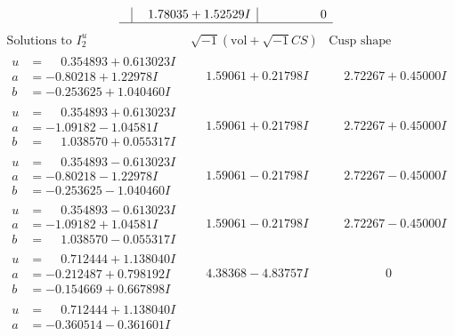 \documentclass[1p]{elsarticle_modified}
\theoremstyle{definition}
\newcommand{\I}{\sqrt{-1}}
\begin{document}
$$\begin{array}{c|c|c}
 & \phantom{-}1.78035 + 1.52529 I & \phantom{-0.000000 } 0\\
 \hline 
 \end{array}$$\newpage$$\begin{array}{c|c|c}  
\text{Solutions to }I^u_{2}& \I (\text{vol} + \sqrt{-1}CS) & \text{Cusp shape}\\
 \hline 
\begin{aligned}
u &= \phantom{-}0.354893 + 0.613023 I \\
a &= -0.80218 + 1.22978 I \\
b &= -0.253625 + 1.040460 I\end{aligned}
 & \phantom{-}1.59061 + 0.21798 I & \phantom{-}2.72267 + 0.45000 I \\ \hline\begin{aligned}
u &= \phantom{-}0.354893 + 0.613023 I \\
a &= -1.09182 - 1.04581 I \\
b &= \phantom{-}1.038570 + 0.055317 I\end{aligned}
 & \phantom{-}1.59061 + 0.21798 I & \phantom{-}2.72267 + 0.45000 I \\ \hline\begin{aligned}
u &= \phantom{-}0.354893 - 0.613023 I \\
a &= -0.80218 - 1.22978 I \\
b &= -0.253625 - 1.040460 I\end{aligned}
 & \phantom{-}1.59061 - 0.21798 I & \phantom{-}2.72267 - 0.45000 I \\ \hline\begin{aligned}
u &= \phantom{-}0.354893 - 0.613023 I \\
a &= -1.09182 + 1.04581 I \\
b &= \phantom{-}1.038570 - 0.055317 I\end{aligned}
 & \phantom{-}1.59061 - 0.21798 I & \phantom{-}2.72267 - 0.45000 I \\ \hline\begin{aligned}
u &= \phantom{-}0.712444 + 1.138040 I \\
a &= -0.212487 + 0.798192 I \\
b &= -0.154669 + 0.667898 I\end{aligned}
 & \phantom{-}4.38368 - 4.83757 I & \phantom{-0.000000 } 0 \\ \hline\begin{aligned}
u &= \phantom{-}0.712444 + 1.138040 I \\
a &= -0.360514 - 0.361601 I \\

\end{aligned}
\end{array}$$
\end{document}
